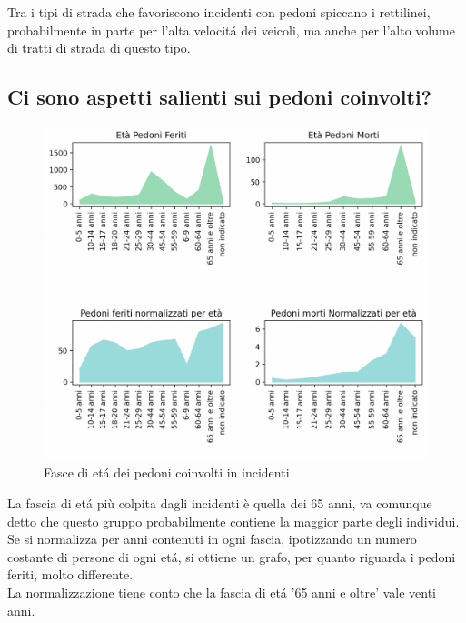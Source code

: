 \documentclass[a4paper]{report}
\begin{document}
Tra i tipi di strada che favoriscono incidenti con pedoni spiccano i rettilinei, 
probabilmente in parte per l'alta velocit\'a dei veicoli, ma anche per l'alto volume di
tratti di strada di questo tipo.


\subsection{Ci sono aspetti salienti sui pedoni coinvolti?}

\begin{figure}
    \includegraphics[width=\linewidth]{../src/incidenti/incidenti_senza_coords/pedoni/eta_pedoni.png}
    \caption{Fasce di et\'a dei pedoni coinvolti in incidenti}
    \label{fig:eta_pedoni}
\end{figure}

La fascia di et\'a più colpita dagli incidenti è quella dei 65 anni, 
va comunque detto che questo gruppo probabilmente contiene la maggior parte degli individui.
Se si normalizza per anni contenuti in ogni fascia, ipotizzando un numero
costante di persone di ogni et\'a, si ottiene un grafo, per quanto riguarda i pedoni 
feriti, molto differente. \\
La normalizzazione tiene conto che la fascia di et\'a '65 anni e oltre' vale venti anni.
\end{document}
